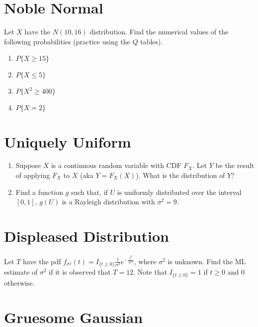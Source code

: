 \documentclass{article}
\begin{document}
\newpage

\section{Noble Normal}

Let $X$ have the $N(10, 16)$ distribution. Find the numerical values of the following probabilities (practice using the $Q$ tables).

\begin{enumerate}[label=(\alph*)]
\itemsep0em
    \item $P\{X \geq 15\}$\vfill
    \item $P\{X \leq 5\}$\vfill
    \item $P\{X^2 \geq 400\}$\vfill
    \item $P\{X = 2\}$\vfill
\end{enumerate}

\section{Uniquely Uniform}

\begin{enumerate}[label=(\alph*)]
    \item Suppose $X$ is a continuous random variable with CDF $F_X$. Let $Y$ be the result of applying $F_X$ to $X$ (aka $Y = F_X(X)$). What is the distribution of $Y$?\vfill
    
    \item Find a function $g$ such that, if $U$ is uniformly distributed over the interval $[0, 1]$, $g(U)$ is a Rayleigh distribution with $\sigma^2 = 9$. \vfill
\end{enumerate}

\newpage

\section{Displeased Distribution}

Let $T$ have the pdf $f_{\sigma^2}(t) = I_{\{t \geq 0\}} \frac{t}{\sigma^2} e^{-\frac{t^2}{2 \sigma^2}}$, where $\sigma^2$ is unknown. Find the ML estimate of $\sigma^2$ if it is observed that $T = 12$. Note that $I_{\{t \geq 0\}} = 1$ if $t \geq 0$ and $0$ otherwise.

\vfill

\section{Gruesome Gaussian}
\end{document}
